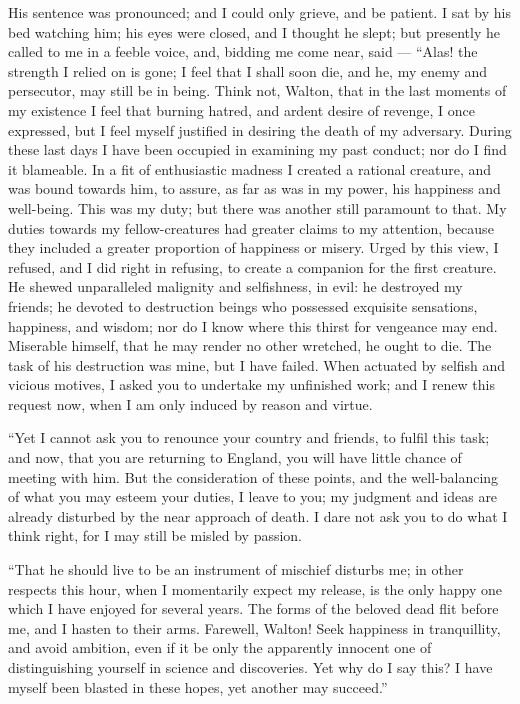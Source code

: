 His sentence was pronounced; and I
could only grieve, and be patient. I
sat by his bed watching him; his eyes
were closed, and I thought he slept;
but presently he called to me in a
feeble voice, and, bidding me come
near, said --- ``Alas! the strength I relied
on is gone; I feel that I shall
soon die, and he, my enemy and persecutor,
may still be in being. Think
not, Walton, that in the last moments
of my existence I feel that burning
hatred, and ardent desire of revenge, I
once expressed, but I feel myself justified
in desiring the death of my adversary.
During these last days I have
been occupied in examining my past
conduct; nor do I find it blameable. In
a fit of enthusiastic madness I created
a rational creature, and was bound towards
him, to assure, as far as was in
my power, his happiness and well-being.
This was my duty; but there
was another still paramount to that.
My duties towards my fellow-creatures
had greater claims to my attention, because
they included a greater proportion
of happiness or misery. Urged
by this view, I refused, and I did right
in refusing, to create a companion for
the first creature. He shewed unparalleled
malignity and selfishness, in
evil: he destroyed my friends; he devoted
to destruction beings who possessed
exquisite sensations, happiness,
and wisdom; nor do I know where
this thirst for vengeance may end.
Miserable himself, that he may render
no other wretched, he ought to die.
The task of his destruction was mine,
but I have failed. When actuated by
selfish and vicious motives, I asked
you to undertake my unfinished work;
and I renew this request now, when
I am only induced by reason and
virtue.

``Yet I cannot ask you to renounce
your country and friends, to fulfil this
task; and now, that you are returning
to England, you will have little chance
of meeting with him. But the consideration
of these points, and the
well-balancing of what you may esteem
your duties, I leave to you; my judgment
and ideas are already disturbed
by the near approach of death. I
dare not ask you to do what I think
right, for I may still be misled by
passion.

``That he should live to be an instrument
of mischief disturbs me; in other
respects this hour, when I momentarily
expect my release, is the only happy
one which I have enjoyed for several
years. The forms of the beloved dead
flit before me, and I hasten to their
arms. Farewell, Walton! Seek happiness
in tranquillity, and avoid ambition,
even if it be only the apparently
innocent one of distinguishing yourself
in science and discoveries. Yet
why do I say this? I have myself been
blasted in these hopes, yet another may
succeed.''


